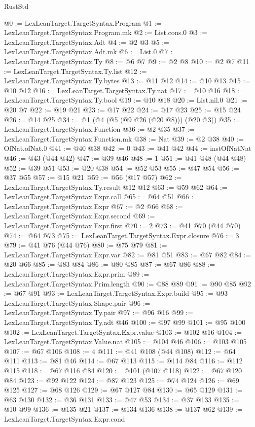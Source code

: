 \begin{lexlean}{RustStd}
\begin{coremodule}
@0 := LexLeanTarget.TargetSyntax.Program
@1 := LexLeanTarget.TargetSyntax.Program.mk
@2 := List.cons.{0}
@3 := LexLeanTarget.TargetSyntax.Adt
@4 := @2 @3
@5 := LexLeanTarget.TargetSyntax.Adt.mk
@6 := List.{0}
@7 := LexLeanTarget.TargetSyntax.Ty
@8 := @6 @7
@9 := @2 @8
@10 := @2 @7
@11 := LexLeanTarget.TargetSyntax.Ty.list
@12 := LexLeanTarget.TargetSyntax.Ty.bytes
@13 := @11 @12
@14 := @10 @13
@15 := @10 @12
@16 := LexLeanTarget.TargetSyntax.Ty.nat
@17 := @10 @16
@18 := LexLeanTarget.TargetSyntax.Ty.bool
@19 := @10 @18
@20 := List.nil.{0}
@21 := @20 @7
@22 := @19 @21
@23 := @17 @22
@24 := @17 @23
@25 := @15 @24
@26 := @14 @25
@34 := @1 (@4 (@5 (@9 @26 (@20 @8))) (@20 @3))
@35 := LexLeanTarget.TargetSyntax.Function
@36 := @2 @35
@37 := LexLeanTarget.TargetSyntax.Function.mk
@38 := Nat
@39 := @2 @38
@40 := OfNat.ofNat.{0}
@41 := @40 @38
@42 := 0
@43 := @41 @42
@44 := instOfNatNat
@46 := @43 (@44 @42)
@47 := @39 @46
@48 := 1
@51 := @41 @48 (@44 @48)
@52 := @39 @51
@53 := @20 @38
@54 := @52 @53
@55 := @47 @54
@56 := @37 @55
@57 := @15 @21
@59 := @56 (@17 @57)
@62 := LexLeanTarget.TargetSyntax.Ty.result @12 @12
@63 := @59 @62
@64 := LexLeanTarget.TargetSyntax.Expr.call
@65 := @64 @51
@66 := LexLeanTarget.TargetSyntax.Expr
@67 := @2 @66
@68 := LexLeanTarget.TargetSyntax.Expr.second
@69 := LexLeanTarget.TargetSyntax.Expr.first
@70 := 2
@73 := @41 @70 (@44 @70)
@74 := @64 @73
@75 := LexLeanTarget.TargetSyntax.Expr.closure
@76 := 3
@79 := @41 @76 (@44 @76)
@80 := @75 @79
@81 := LexLeanTarget.TargetSyntax.Expr.var
@82 := @81 @51
@83 := @67 @82
@84 := @20 @66
@85 := @83 @84
@86 := @80 @85
@87 := @67 @86
@88 := LexLeanTarget.TargetSyntax.Expr.prim
@89 := LexLeanTarget.TargetSyntax.Prim.length
@90 := @88 @89
@91 := @90 @85
@92 := @67 @91
@93 := LexLeanTarget.TargetSyntax.Expr.build
@95 := @93 LexLeanTarget.TargetSyntax.Shape.pair
@96 := LexLeanTarget.TargetSyntax.Ty.pair
@97 := @96 @16
@99 := LexLeanTarget.TargetSyntax.Ty.adt @46
@100 := @97 @99
@101 := @95 @100
@102 := LexLeanTarget.TargetSyntax.Expr.value
@103 := @102 @16
@104 := LexLeanTarget.TargetSyntax.Value.nat
@105 := @104 @46
@106 := @103 @105
@107 := @67 @106
@108 := 4
@111 := @41 @108 (@44 @108)
@112 := @64 @111
@113 := @81 @46
@114 := @67 @113
@115 := @114 @84
@116 := @112 @115
@118 := @67 @116 @84
@120 := @101 (@107 @118)
@122 := @67 @120 @84
@123 := @92 @122
@124 := @87 @123
@125 := @74 @124
@126 := @69 @125
@127 := @68 @126
@129 := @67 @127 @84
@130 := @65 @129
@131 := @63 @130
@132 := @36 @131
@133 := @47 @53
@134 := @37 @133
@135 := @10 @99
@136 := @135 @21
@137 := @134 @136
@138 := @137 @62
@139 := LexLeanTarget.TargetSyntax.Expr.cond

\end{coremodule}
\end{lexlean}

